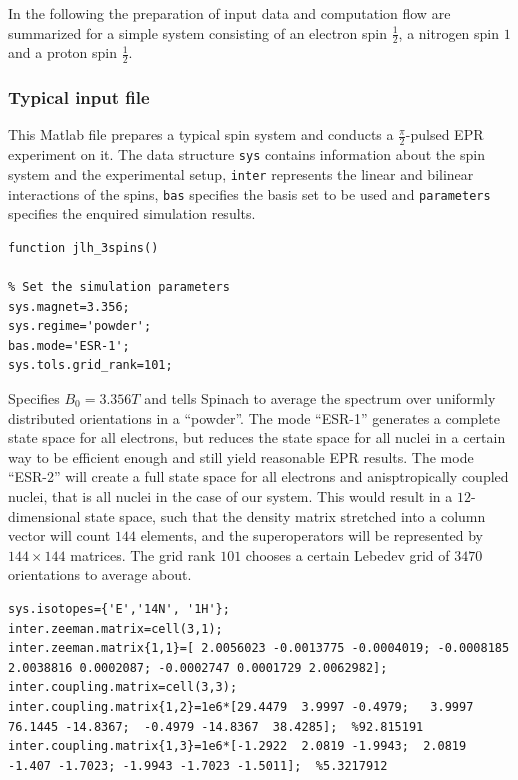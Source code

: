 \documentclass[11.5pt,a4paper]{article}
\begin{document}
In the following the preparation of input data and computation flow are summarized for a simple system consisting of an electron spin $\tfrac{1}{2}$, a nitrogen spin $1$ and a proton spin $\tfrac{1}{2}$.%

\subsubsection{Typical input file}
This Matlab file prepares a typical spin system and conducts a $\tfrac{\pi}{2}$-pulsed EPR experiment on it. The data structure \verb$sys$ contains information about the spin system and the experimental setup, \verb$inter$ represents the linear and bilinear interactions of the spins, \verb$bas$ specifies the basis set to be used and \verb$parameters$ specifies the enquired simulation results. 
\begin{lstlisting}
function jlh_3spins()

% Set the simulation parameters
sys.magnet=3.356;
sys.regime='powder';
bas.mode='ESR-1';
sys.tols.grid_rank=101;
\end{lstlisting} 
Specifies $B_0 = 3.356 T$ and tells Spinach to average the spectrum over uniformly distributed orientations in a ``powder''. The mode ``ESR-1'' generates a complete state space for all electrons, but reduces the state space for all nuclei in a certain way to be efficient enough and still yield reasonable EPR results. 
The mode ``ESR-2'' will create a full state space for all electrons and anisptropically coupled nuclei, that is all nuclei in the case of our system. This would result in a $12$-dimensional state space, such that the density matrix stretched into a column vector will count $144$ elements, and the superoperators will be represented by $144\times144$ matrices. The grid rank $101$ chooses a certain Lebedev grid of $3470$ orientations to average about.
\begin{lstlisting}[firstnumber=last]
% Interactions
sys.isotopes={'E','14N', '1H'};
inter.zeeman.matrix=cell(3,1);
inter.zeeman.matrix{1,1}=[ 2.0056023 -0.0013775 -0.0004019; -0.0008185 2.0038816 0.0002087; -0.0002747 0.0001729 2.0062982];
inter.coupling.matrix=cell(3,3);
inter.coupling.matrix{1,2}=1e6*[29.4479  3.9997 -0.4979;   3.9997  76.1445 -14.8367;  -0.4979 -14.8367  38.4285];  %92.815191
inter.coupling.matrix{1,3}=1e6*[-1.2922  2.0819 -1.9943;  2.0819  -1.407 -1.7023; -1.9943 -1.7023 -1.5011];  %5.3217912
\end{lstlisting}
\end{document}
